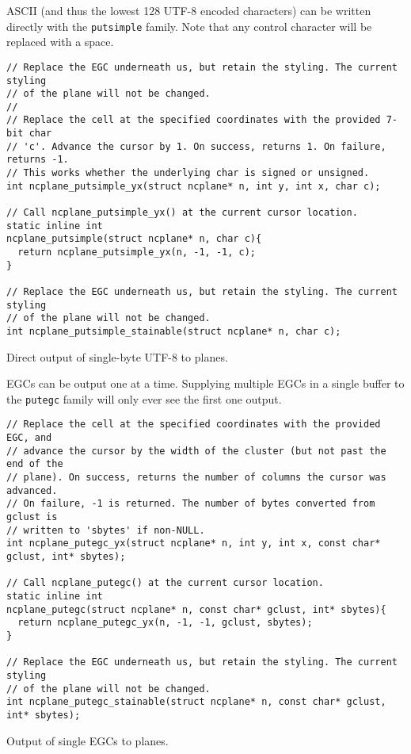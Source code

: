 ASCII (and thus the lowest 128 UTF-8 encoded characters) can be written directly
with the \texttt{putsimple} family. Note that any control character will be replaced with
a space.

\begin{listing}[!htbp]
\begin{verbatim}
// Replace the EGC underneath us, but retain the styling. The current styling
// of the plane will not be changed.
//
// Replace the cell at the specified coordinates with the provided 7-bit char
// 'c'. Advance the cursor by 1. On success, returns 1. On failure, returns -1.
// This works whether the underlying char is signed or unsigned.
int ncplane_putsimple_yx(struct ncplane* n, int y, int x, char c);

// Call ncplane_putsimple_yx() at the current cursor location.
static inline int
ncplane_putsimple(struct ncplane* n, char c){
  return ncplane_putsimple_yx(n, -1, -1, c);
}

// Replace the EGC underneath us, but retain the styling. The current styling
// of the plane will not be changed.
int ncplane_putsimple_stainable(struct ncplane* n, char c);
\end{verbatim}
\caption{Direct output of single-byte UTF-8 to planes.}
\label{list:putc}
\end{listing}

EGCs can be output one at a time. Supplying multiple EGCs in a single buffer
to the \texttt{putegc} family will only ever see the first one output.

\begin{listing}[!htbp]
\begin{verbatim}
// Replace the cell at the specified coordinates with the provided EGC, and
// advance the cursor by the width of the cluster (but not past the end of the
// plane). On success, returns the number of columns the cursor was advanced.
// On failure, -1 is returned. The number of bytes converted from gclust is
// written to 'sbytes' if non-NULL.
int ncplane_putegc_yx(struct ncplane* n, int y, int x, const char* gclust, int* sbytes);

// Call ncplane_putegc() at the current cursor location.
static inline int
ncplane_putegc(struct ncplane* n, const char* gclust, int* sbytes){
  return ncplane_putegc_yx(n, -1, -1, gclust, sbytes);
}

// Replace the EGC underneath us, but retain the styling. The current styling
// of the plane will not be changed.
int ncplane_putegc_stainable(struct ncplane* n, const char* gclust, int* sbytes);
\end{verbatim}
\caption{Output of single EGCs to planes.}
\label{list:putc}
\end{listing}


